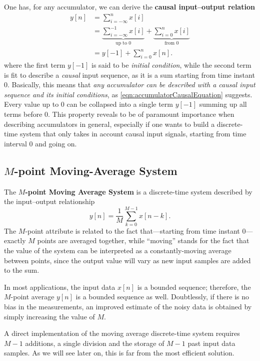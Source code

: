 \documentclass[\documentfontsize, twocolumn]{\classname}
\begin{document}
One has, for any accumulator, we can derive the \textbf{causal input--output relation}
\begin{align}
    y[n] &= \sum_{i=-\infty}^{n} x[i] \\
         &= \underbrace{\sum_{i=-\infty}^{-1} x[i]}_{\mbox{up to } 0} + \underbrace{\sum_{i=0}^{n}x[i]}_{\mbox{from } 0}\\
         &= y[-1] + \sum_{i=0}^n x[n].\label{eqn:accumulatorCausalEquation}
\end{align}
where the first term $y[-1]$ is said to be \emph{initial condition}, while the second term is fit to describe a \emph{causal} input sequence, as it is a sum starting from time instant $0$. Basically, this means that \emph{any accumulator can be described with a causal input sequence and its initial conditions}, as \ref{eqn:accumulatorCausalEquation} suggests. Every value up to $0$ can be collapsed into a single term $y[-1]$ summing up all terms before $0$. This property reveals to be of paramount importance when describing accumulators in general, especially if one wants to build a discrete-time system that only takes in account causal input signals, starting from time interval $0$ and going on.

\subsection{$M$-point Moving-Average System}

The \textbf{$M$-point Moving Average System} is a discrete-time system described by the input--output relationship
\begin{equation}\label{eqn:mPointMovingAverageEquation}
    y[n] = \frac 1 M \sum_{k=0}^{M-1} x[n-k].
\end{equation}
The $M$-point attribute is related to the fact that---starting from time instant $0$---exactly $M$ points are averaged together, while ``moving'' stands for the fact that the value of the system can be interpreted as a constantly-moving average between points, since the output value will vary as new input samples are added to the sum.

In most applications, the input data $x[n]$ is a bounded sequence; therefore, the $M$-point average $y[n]$ is a bounded sequence as well. Doubtlessly, if there is no bias in the measurements, an improved estimate of the noisy data is obtained by simply increasing the value of $M$.

A direct implementation of the moving average discrete-time system requires $M-1$ additions, a single division and the storage of $M-1$ past input data samples. As we will see later on, this is far from the most efficient solution.
\end{document}
